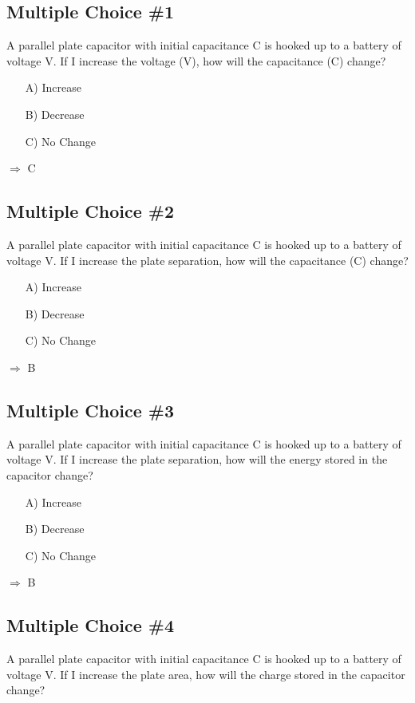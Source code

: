 \documentclass[11pt]{article}
\begin{document}
\pagebreak
\subsection{Multiple Choice \#1}
A parallel plate capacitor with initial capacitance C is hooked up to a battery of voltage V.  If I increase the voltage (V), how will the capacitance (C) change?

\begin{itemize}
\item[A)] Increase
\item[B)] Decrease
\item[C)] No Change
\end{itemize}
$\Rightarrow$ C

\subsection{Multiple Choice \#2}
A parallel plate capacitor with initial capacitance C is hooked up to a battery of voltage V.  If I increase the plate separation, how will the capacitance (C) change?

\begin{itemize}
\item[A)] Increase
\item[B)] Decrease
\item[C)] No Change
\end{itemize}
$\Rightarrow$ B

\subsection{Multiple Choice \#3}
A parallel plate capacitor with initial capacitance C is hooked up to a battery of voltage V.  If I increase the plate separation, how will the energy stored in the capacitor change?

\begin{itemize}
\item[A)] Increase
\item[B)] Decrease
\item[C)] No Change
\end{itemize}
$\Rightarrow$ B

\subsection{Multiple Choice \#4}
A parallel plate capacitor with initial capacitance C is hooked up to a battery of voltage V.  If I increase the plate area, how will the charge stored in the capacitor change?
\end{document}
